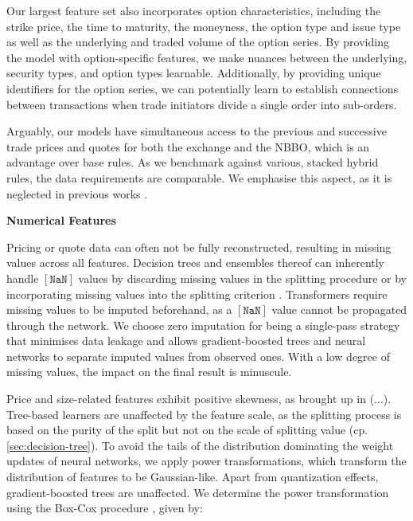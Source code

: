 
Our largest feature set also incorporates option characteristics, including the strike price, the time to maturity, the moneyness, the option type and issue type as well as the underlying and traded volume of the option series. By providing the model with option-specific features, we make nuances between the underlying, security types, and option types learnable. Additionally, by providing unique identifiers for the option series, we can potentially learn to establish connections between transactions when trade initiators divide a single order into sub-orders.

Arguably, our models have simultaneous access to the previous and successive trade prices and quotes for both the exchange and the NBBO, which is an advantage over base rules. As we benchmark against various, stacked hybrid rules, the data requirements are comparable. We emphasise this aspect, as it is neglected in previous works \autocites[][485]{blazejewskiLocalNonParametricModel2005}[][48]{ronenMachineLearningTrade2022}[][9]{rosenthalModelingTradeDirection2012}.

\textbf{Numerical Features}

Pricing or quote data can often not be fully reconstructed, resulting in missing values across all features. Decision trees and ensembles thereof can inherently handle $\mathtt{[NaN]}$ values by discarding missing values in the splitting procedure \autocite[][150--152]{breimanClassificationRegressionTrees2017} or by incorporating missing values into the splitting criterion \autocite[][951]{twalaGoodMethodsCoping2008}. Transformers require missing values to be imputed beforehand, as a $\mathtt{[NaN]}$ value cannot be propagated through the network. We choose zero imputation for being a single-pass strategy that minimises data leakage and allows gradient-boosted trees and neural networks to separate imputed values from observed ones. With a low degree of missing values, the impact on the final result is minuscule.

Price and size-related features exhibit positive skewness, as brought up in (...). Tree-based learners are unaffected by the feature scale, as the splitting process is based on the purity of the split but not on the scale of splitting value (cp. \cref{sec:decision-tree}). To avoid the tails of the distribution dominating the weight updates of neural networks, we apply power transformations, which transform the distribution of features to be Gaussian-like. Apart from quantization effects, gradient-boosted trees are unaffected. We determine the power transformation using the Box-Cox procedure \autocite[][214]{boxAnalysisTransformations2022}, given by:

